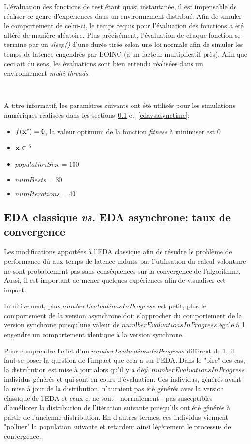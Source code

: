 \documentclass[a4paper, 12pt]{report}
\begin{document}
L'évaluation des fonctions de test étant quasi instantanée, il est impensable de réaliser ce genre d'expériences dans un environnement distribué. Afin de simuler le comportement de celui-ci, le temps requis pour l'évaluation des fonctions a été altéré de manière aléatoire. Plus précisément, l'évaluation de chaque fonction se termine par un \textit{sleep()} d'une durée tirée selon une loi normale afin de simuler les temps de latence engendrés par \textsc{BOINC} (à un facteur multiplicatif près). Afin que ceci ait du sens, les évaluations sont bien entendu réalisées dans un environnement \textit{multi-threads}.

\ 

A titre informatif, les paramètres suivants ont été utilisés pour les simulations numériques réalisées dans les sections~\ref{edavsasync} et~\ref{edavsasynctime}:
\begin{itemize}
\item $f(\bf{x}^*) = 0$, la valeur optimum de la fonction \textit{fitness} à minimiser est 0
\item $\bf{x} \in $ $^{5}$
\item $populationSize = 100$
\item $numBests = 30$
\item $numIterations = 40$
\end{itemize}


\subsection{EDA classique \textit{vs.} EDA asynchrone: taux de convergence}
\label{edavsasync}
Les modifications apportées à l'EDA classique afin de résudre le problème de performance dû aux temps de latence induits par l'utilisation du calcul volontaire ne sont probablement pas sans conséquences sur la convergence de l'algorithme. Aussi, il est important de mener quelques expériences afin de visualiser cet impact.

Intuitivement, plus $numberEvaluationsInProgress$ est petit, plus le comportement de la version asynchrone doit s'approcher du comportement de la version synchrone puisqu'une valeur de $num!berEvaluationsInProgress$ égale à 1 engendre un comportement identique à la version synchrone.

Pour comprendre l'effet d'un $numberEvaluationsInProgress$ différent de 1, il faut se poser la question de l'impact que cela a sur l'EDA. Dans le "pire" des cas, la distribution est mise à jour alors qu'il y a déjà $numberEvaluationsInProgress$ individus générés et qui sont en cours d'évaluation. Ces individus, générés avant la mise à jour de la distribution, n'auraient pas été générés avec la version classique de l'EDA et ceux-ci ne sont - normalement - pas susceptibles d'améliorer la distribution de l'itération suivante puisqu'ils ont été générés à partir de l'ancienne distribution. En d'autres termes, ces individus viennent "polluer" la population suivante et retardent ainsi légèrement le processus de convergence.
\end{document}
